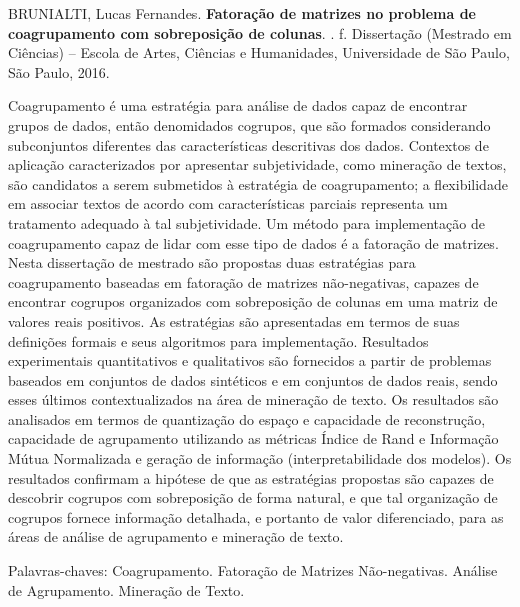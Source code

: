 \documentclass[
    12pt,                %
    oneside,            %
    a4paper,            %
    english,            %
    brazil                %
    ]{abntex2ppgsi}
\begin{document}
\setlength{\absparsep}{18pt} %
\begin{resumo}

%
%
%
%
\begin{flushleft}
BRUNIALTI, Lucas Fernandes. \textbf{Fatoração de matrizes no problema de coagrupamento com sobreposição de colunas}. \imprimirdata. \pageref{LastPage} f. Dissertação (Mestrado em Ciências) – Escola de Artes, Ciências e Humanidades, Universidade de São Paulo, São Paulo, 2016.
\end{flushleft}

Coagrupamento é uma estratégia para análise de dados capaz de encontrar grupos de dados, então denomidados cogrupos, que são formados considerando subconjuntos diferentes das  características descritivas dos dados.
Contextos de aplicação caracterizados por apresentar subjetividade, como mineração de textos, são candidatos a serem submetidos à estratégia de coagrupamento; a flexibilidade em associar textos de acordo com características parciais representa um tratamento adequado à tal subjetividade.
Um método para implementação de coagrupamento capaz de lidar com esse tipo de dados é a fatoração de matrizes.
Nesta dissertação de mestrado são propostas duas estratégias para coagrupamento baseadas em fatoração de matrizes não-negativas, capazes de encontrar cogrupos organizados com sobreposição de colunas em uma matriz de valores reais positivos.
As estratégias são apresentadas em termos de suas definições formais e seus algoritmos para implementação.
Resultados experimentais quantitativos e qualitativos são fornecidos a partir de problemas baseados em conjuntos de dados sintéticos e em conjuntos de dados reais, sendo esses últimos contextualizados na área de mineração de texto.
Os resultados são analisados em termos de quantização do espaço e capacidade de reconstrução, capacidade de agrupamento utilizando as métricas Índice de Rand e Informação Mútua Normalizada e geração de informação (interpretabilidade dos modelos).
Os resultados confirmam a hipótese de que as estratégias propostas são capazes de descobrir cogrupos com sobreposição de forma natural, e que tal organização de cogrupos fornece informação detalhada, e portanto de valor diferenciado, para as áreas de análise de agrupamento e mineração de texto.

Palavras-chaves: Coagrupamento. Fatoração de Matrizes Não-negativas. Análise de Agrupamento. Mineração de Texto.
\end{resumo}
\end{document}
